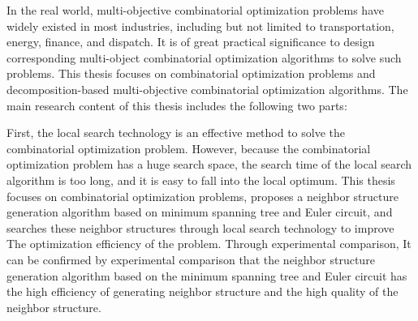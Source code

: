 \begin{abstractEn}
    \label{abstractEn} 
        In the real world, multi-objective combinatorial optimization problems have widely existed in most industries, including but not limited to transportation, energy, finance, and dispatch. It is of great practical significance to design corresponding multi-object combinatorial optimization algorithms to solve such problems. This thesis focuses on combinatorial optimization problems and decomposition-based multi-objective combinatorial optimization algorithms. The main research content of this thesis includes the following two parts:
        \par
        First, the local search technology is an effective method to solve the combinatorial optimization problem. However, because the combinatorial optimization problem has a huge search space, the search time of the local search algorithm is too long, and it is easy to fall into the local optimum. 
        This thesis focuses on combinatorial optimization problems, proposes a neighbor structure generation algorithm based on minimum spanning tree and Euler circuit, and searches these neighbor structures through local search technology to improve The optimization efficiency of the problem. Through experimental comparison, It can be confirmed by experimental comparison that the neighbor structure generation algorithm based on the minimum spanning tree and Euler circuit has the high efficiency of generating neighbor structure and the high quality of the neighbor structure.
        \par

\end{abstractEn}
